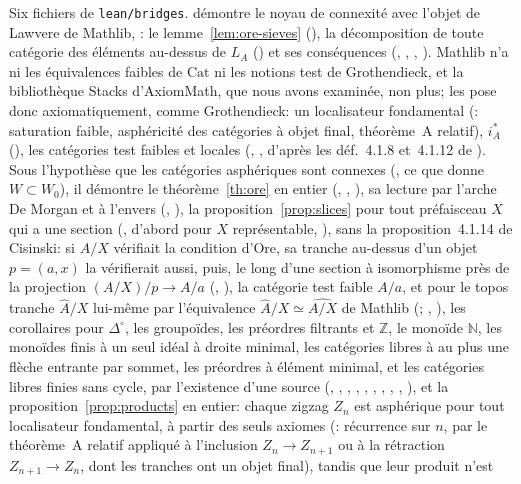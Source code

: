 \leanentry{} Six fichiers de \texttt{lean/bridges}.  démontre le noyau de connexité avec l'objet de Lawvere de Mathlib, : le lemme~\ref{lem:ore-sieves} (), la décomposition de toute catégorie des éléments au-dessus de $L_A$ () et ses conséquences (, , , ). Mathlib n'a ni les équivalences faibles de $\mathrm{Cat}$ ni les notions test de Grothendieck, et la bibliothèque Stacks d'AxiomMath, que nous avons examinée, non plus;  les pose donc axiomatiquement, comme Grothendieck: un localisateur fondamental (: saturation faible, asphéricité des catégories à objet final, théorème~A relatif), $i_A^*$ (), les catégories test faibles et locales (, , d'après les déf.~4.1.8 et~4.1.12 de \cite{cisinski-308}). Sous l'hypothèse que les catégories asphériques sont connexes (, ce que donne $W\subset W_0$), il démontre le théorème~\ref{th:ore} en entier (, , ), sa lecture par l'arche De Morgan et à l'envers (, ), la proposition~\ref{prop:slices} pour tout préfaisceau $X$ qui a une section (, d'abord pour $X$ représentable, ), sans la proposition~4.1.14 de Cisinski: si $A/X$ vérifiait la condition d'Ore, sa tranche au-dessus d'un objet $p=(a,x)$ la vérifierait aussi, puis, le long d'une section à isomorphisme près de la projection $(A/X)/p\to A/a$ (, ), la catégorie test faible $A/a$, et pour le topos tranche $\widehat A/X$ lui-même par l'équivalence $\widehat A/X\simeq\widehat{A/X}$ de Mathlib (; , ), les corollaires pour $\Delta^{\circ}$, les groupoïdes, les préordres filtrants et $\mathbb Z$, le monoïde $\mathbb N$, les monoïdes finis à un seul idéal à droite minimal, les catégories libres à au plus une flèche entrante par sommet, les préordres à élément minimal, et les catégories libres finies sans cycle, par l'existence d'une source (, , , , , , , , , ), et la proposition~\ref{prop:products} en entier: chaque zigzag $Z_n$ est asphérique pour tout localisateur fondamental, à partir des seuls axiomes (: récurrence sur $n$, par le théorème~A relatif appliqué à l'inclusion $Z_n\to Z_{n+1}$ ou à la rétraction $Z_{n+1}\to Z_n$, dont les tranches ont un objet final), tandis que leur produit n'est 